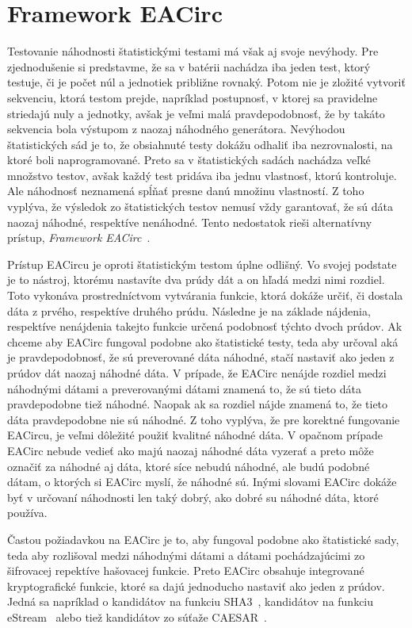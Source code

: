 \chapter{Framework EACirc}
\label{chap:eacirc}

Testovanie náhodnosti štatistickými testami má však aj svoje nevýhody. Pre zjednodušenie si predstavme, že sa v batérii nachádza iba jeden test, ktorý testuje, či je počet núl a jednotiek približne rovnaký. Potom nie je zložité vytvoriť sekvenciu, ktorá testom prejde, napríklad postupnosť, v ktorej sa pravidelne striedajú nuly a jednotky, avšak je veľmi malá pravdepodobnosť, že by takáto sekvencia bola výstupom z naozaj náhodného generátora. Nevýhodou štatistických sád je to, že obsiahnuté testy dokážu odhaliť iba nezrovnalosti, na ktoré boli naprogramované. Preto sa v štatistických sadách nachádza veľké množstvo testov, avšak každý test pridáva iba jednu vlastnosť, ktorú kontroluje. Ale náhodnosť neznamená spĺňať presne danú množinu vlastností. Z toho vyplýva, že výsledok zo štatistických testov nemusí vždy garantovať, že sú dáta naozaj náhodné, respektíve nenáhodné. Tento nedostatok rieši alternatívny prístup, \textit{Framework EACirc}~\parencite{ukrop-bc}. 

Prístup EACircu je oproti štatistickým testom úplne odlišný. Vo svojej podstate je to nástroj, ktorému nastavíte dva prúdy dát a on hľadá medzi nimi rozdiel. Toto vykonáva prostredníctvom vytvárania funkcie, ktorá dokáže určiť, či dostala dáta z prvého, respektíve druhého prúdu. Následne je na základe nájdenia, respektíve nenájdenia takejto funkcie určená podobnosť týchto dvoch prúdov. Ak chceme aby EACirc fungoval podobne ako štatistické testy, teda aby určoval aká je pravdepodobnosť, že sú preverované dáta náhodné, stačí nastaviť ako jeden z prúdov dát naozaj náhodné dáta. V prípade, že EACirc nenájde rozdiel medzi náhodnými dátami a preverovanými dátami znamená to, že sú tieto dáta pravdepodobne tiež náhodné. Naopak ak sa rozdiel nájde znamená to, že tieto dáta pravdepodobne nie sú náhodné. Z toho vyplýva, že pre korektné fungovanie EACircu, je veľmi dôležité použiť kvalitné náhodné dáta. V opačnom prípade EACirc nebude vedieť ako majú naozaj náhodné dáta vyzerať a preto môže označiť za náhodné aj dáta, ktoré síce nebudú náhodné, ale budú podobné dátam, o ktorých si EACirc myslí, že náhodné sú. Inými slovami EACirc dokáže byť v určovaní náhodnosti len taký dobrý, ako dobré su náhodné dáta, ktoré používa.

Častou požiadavkou na EACirc je to, aby fungoval podobne ako štatistické sady, teda aby rozlišoval medzi náhodnými dátami a dátami pochádzajúcimi zo šifrovacej repektíve hašovacej funkcie. Preto EACirc obsahuje integrované kryptografické funkcie, ktoré sa dajú jednoducho nastaviť ako jeden z prúdov. Jedná sa napríklad o kandidátov na funkciu SHA3~\cite{thesis-dubovec}, kandidátov na funkciu eStream~\parencite{thesis-pristak} alebo tiež kandidátov zo súťaže CAESAR~\cite{ukrop-master}.

